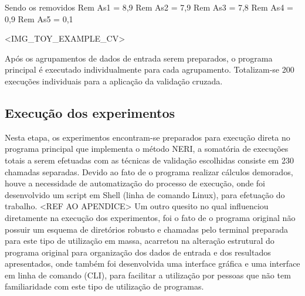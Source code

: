 Sendo os removidos
Rem As1 = 8,9
Rem As2 = 7,9
Rem As3 = 7,8
Rem As4 = 0,9
Rem As5 = 0,1 

<IMG_TOY_EXAMPLE_CV>

Após os agrupamentos de dados de entrada serem preparados, o programa principal é executado individualmente para cada agrupamento. Totalizam-se 200 execuções individuais para a aplicação da validação cruzada.


\subsection{Execução dos experimentos}

Nesta etapa, os experimentos encontram-se preparados para execução direta no programa principal que implementa o método NERI, a somatória de execuções totais a serem efetuadas com as técnicas de validação escolhidas consiste em 230 chamadas separadas.
Devido ao fato de o programa realizar cálculos demorados, houve a necessidade de automatização do processo de execução, onde foi desenvolvido um script em Shell (linha de comando Linux), para efetuação do trabalho. <REF AO APENDICE>
Um outro quesito no qual influenciou diretamente na execução dos experimentos, foi o fato de o programa original não possuir um esquema de diretórios robusto e chamadas pelo terminal preparada para este tipo de utilização em massa, acarretou na alteração estrutural do programa original para organização dos dados de entrada e dos resultados apresentados, onde também foi desenvolvida uma interface gráfica e uma interface em linha de comando (CLI), para facilitar a utilização por pessoas que não tem familiaridade com este tipo de utilização de programas.



